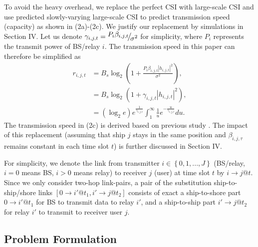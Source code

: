 \documentclass[conference]{IEEEtran}
\begin{document}
 To avoid the heavy overhead, we replace the perfect CSI with large-scale CSI and use predicted slowly-varying large-scale CSI to predict transmission speed (capacity) as shown in (2a)-(2c). We justify our replacement by simulations in Section IV. Let us denote ${\gamma _{i,j,t }} = {\raise0.7ex\hbox{${{P_{i} }{\beta _{i,j,t }}}$} \!\mathord{\left/
  {\vphantom {{{P_{i} }{\beta _{i,j,t }}} {{\sigma ^2}}}}\right.\kern-\nulldelimiterspace}
 \!\lower0.7ex\hbox{${{\sigma ^2}}$}}$ for simplicity, where ${P_{i}}$ represents the transmit power of BS/relay $i$. The transmission speed in this paper can therefore be simplified as
 \begin{subequations}
 \begin{align}
 {r_{i,j,t}} & = {{B_s}{{\log }_2}\left( {1 + \frac{{{P_{i} }{\beta _{i,j,t }}{{\left| {{h_{i,j,t }}} \right|}^2}}}{{{\sigma ^2}}}} \right)},\\
 & = {B_s}{\log }_2 \left( {1 + {\gamma _{i,j,t }}{{\left| {{h_{i,j,t }}} \right|}^2}} \right),\\
 & = \left( {{{\log }_2}e} \right){e^{\frac{1}{{{\gamma _{i,j,t }}}}}}\int_1^\infty {\frac{1}{u}{e^{ - \frac{u}{{{\gamma _{i,j,t }}}}}}du} .
 \end{align}
 \end{subequations}
 The transmission speed in (2c) is derived based on previous study \cite{p41}. The impact of this replacement (assuming that ship $j$ stays in the same position and $\beta _{i,j,\tau }$ remains constant in each time slot $t$) is further discussed in Section IV. 

 For simplicity, we denote the link from transmitter $i \in \left\{ {0,1,...,J} \right\}$ (BS/relay, $i = 0$ means BS, $i > 0$ means relay) to receiver $j$ (user) at time slot $t$ by $i \to j@t$. Since we only consider two-hop link-pairs, a pair of the substitution ship-to-ship/shore links $\left[ {0 \to i'@{t_1},i' \to j@{t_2}} \right]$ consists of exact a ship-to-shore part $0 \to i'@{t_1}$ for BS to transmit data to relay ${i'}$, and a ship-to-ship part $i' \to j@{t_2}$ for relay ${i'}$ to transmit to receiver user $j$. 
 
 
 \subsection{Problem Formulation}
 
\end{document}

